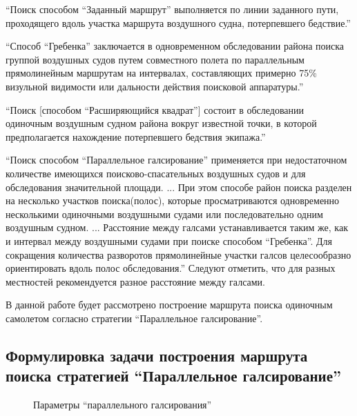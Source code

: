 ``Поиск способом ``Заданный маршрут'' выполняется по линии заданного пути, проходящего вдоль
участка маршрута воздушного судна, потерпевшего бедствие.''

``Способ ``Гребенка'' заключается в одновременном обследовании района поиска группой воздушных судов
путем совместного полета по параллельным прямолинейным маршрутам на интервалах, составляющих
примерно 75\% визульной видимости или дальности действия поисковой аппаратуры.''

``Поиск [способом ``Расширяющийся квадрат''] состоит в обследовании одиночным воздушным судном
района вокруг известной точки, в которой предполагается нахождение потерпевшего бедствия экипажа.''

``Поиск способом ``Параллельное галсирование'' применяется при недостаточном количестве имеющихся
поисково-спасательных воздушных судов и для обследования значительной площади. ... При этом способе
район поиска разделен на несколько участков поиска(полос), которые просматриваются одновременно
несколькими одиночными воздушными судами или последовательно одним воздушным судном. ... Расстояние
между галсами устанавливается таким же, как и интервал между воздушными судами при поиске способом
``Гребенка''. Для сокращения количества разворотов прямолинейные участки галсов целесообразно
 ориентировать вдоль полос обследования.'' Следуют отметить, что для разных местностей
 рекомендуется разное расстояние между галсами.

В данной работе будет рассмотрено построение маршрута поиска одиночным самолетом согласно
стратегии ``Параллельное галсирование''.

\FloatBarrier
\subsection{Формулировка задачи построения маршрута поиска стратегией
``Параллельное галсирование''}
\begin{figure}
  \caption{Параметры ``параллельного галсирования''}
  \label{tacks-lh}
\end{figure}

